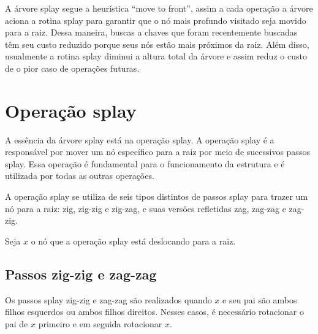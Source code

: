 A árvore splay segue a heurística “move to front”, assim a cada operação a árvore aciona a rotina splay para garantir que o nó mais profundo visitado seja movido para a raiz. Dessa maneira, buscas a chaves que foram recentemente buscadas têm seu custo reduzido porque seus nós estão mais próximos da raiz. Além disso, usualmente a rotina splay diminui a altura total da árvore e assim reduz o custo de o pior caso de operações futuras.

{

\section{Operação splay}

A essência da árvore splay está na operação splay. A operação splay é a responsável por mover um nó específico para a raiz por meio de sucessivos passos splay. Essa operação é fundamental para o funcionamento da estrutura e é utilizada por todas as outras operações.

A operação splay se utiliza de seis tipos distintos de passos splay para trazer um nó para a raiz: zig, zig-zig e zig-zag, e suas versões refletidas zag, zag-zag e zag-zig. 

Seja $x$ o nó que a operação splay está deslocando para a raiz.

\subsection{Passos zig-zig e zag-zag}

Os passos splay zig-zig e zag-zag são realizados quando $x$ e seu pai são ambos filhos esquerdos ou ambos filhos direitos. Nesses casos, é necessário rotacionar o pai de $x$ primeiro e em seguida rotacionar $x$.

\begin{figure}[H]
    \centering
    \begin{comment}
    \begin{tikzpicture}[
        ed/.style = {densely dashed, shorten >= 5pt},
        alpha/.style = {regular polygon, regular polygon sides=3, draw, minimum size=1.1cm, inner sep=2pt, anchor=south},
        level distance=1.5cm,
        sibling distance=0.25cm
        ]
        

\end{comment}
\end{figure}}
